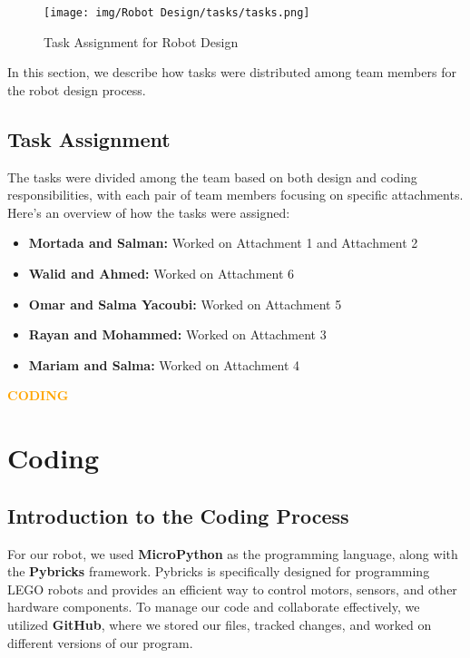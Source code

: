 \begin{figure}[ht]
    \centering
    \texttt{[image: img/Robot Design/tasks/tasks.png]} 
    \caption{Task Assignment for Robot Design}
\end{figure}

In this section, we describe how tasks were distributed among team members for the robot design process.

\subsection{Task Assignment}
The tasks were divided among the team based on both design and coding responsibilities, with each pair of team members focusing on specific attachments. Here's an overview of how the tasks were assigned:

\begin{itemize}
    \item \textbf{Mortada and Salman:} Worked on Attachment 1 and Attachment 2
    \item \textbf{Walid and Ahmed:} Worked on Attachment 6
    \item \textbf{Omar and Salma Yacoubi:} Worked on Attachment 5
    \item \textbf{Rayan and Mohammed:} Worked on Attachment 3
    \item \textbf{Mariam and Salma:} Worked on Attachment 4
\end{itemize}



\newpage
\begin{center}
    \huge \textbf{\textcolor{orange}{CODING}} \\[0.5cm]
\end{center}
\section{Coding}


\subsection{Introduction to the Coding Process}
For our robot, we used \textbf{MicroPython} as the programming language, along with the \textbf{Pybricks} framework. Pybricks is specifically designed for programming LEGO robots and provides an efficient way to control motors, sensors, and other hardware components. \newline
To manage our code and collaborate effectively, we utilized \textbf{GitHub}, where we stored our files, tracked changes, and worked on different versions of our program.

